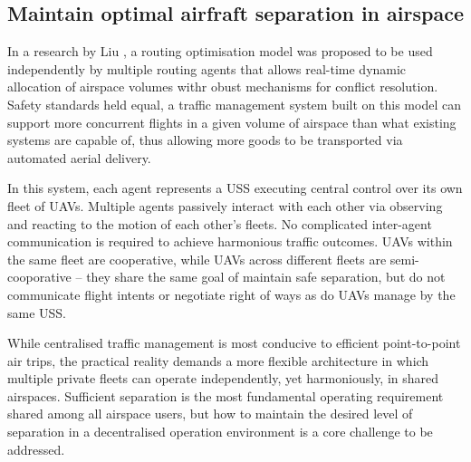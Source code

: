 \subsection{Maintain optimal airfraft separation in airspace}

In a research by Liu \cite{LIU2021100058}, a routing optimisation model was proposed to be used independently by multiple routing agents that allows real-time dynamic allocation of airspace volumes withr obust mechanisms for conflict resolution.
Safety standards held equal, a traffic management system built on this model can support more concurrent flights in a given volume of airspace than what existing systems are capable of, thus allowing more goods to be transported via automated aerial delivery.

In this system, each agent represents a USS executing central control over its own fleet of UAVs.
Multiple agents passively interact with each other via observing and reacting to the motion of each other's fleets.
No complicated inter-agent communication is required to achieve harmonious traffic outcomes. 
UAVs within the same fleet are cooperative, while UAVs across different fleets are semi-cooporative -- they share the same goal of maintain safe separation, but do not communicate flight intents or negotiate right of ways as do UAVs manage by the same USS.

While centralised traffic management is most conducive to efficient point-to-point air trips, the practical reality demands a more flexible architecture in which multiple private fleets can operate independently, yet harmoniously, in shared airspaces.
Sufficient separation is the most fundamental operating requirement shared among all airspace users, but how to maintain the desired level of separation in a decentralised operation environment is a core challenge to be addressed.







